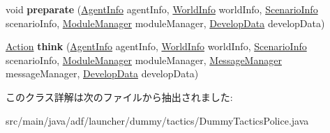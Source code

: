 \begin{DoxyCompactItemize}
\item 
\hypertarget{classadf_1_1launcher_1_1dummy_1_1tactics_1_1DummyTacticsPolice_ab4b404a1c2e61b3d0003aa7db622470f}{}\label{classadf_1_1launcher_1_1dummy_1_1tactics_1_1DummyTacticsPolice_ab4b404a1c2e61b3d0003aa7db622470f} 
void {\bfseries preparate} (\hyperlink{classadf_1_1agent_1_1info_1_1AgentInfo}{Agent\+Info} agent\+Info, \hyperlink{classadf_1_1agent_1_1info_1_1WorldInfo}{World\+Info} world\+Info, \hyperlink{classadf_1_1agent_1_1info_1_1ScenarioInfo}{Scenario\+Info} scenario\+Info, \hyperlink{classadf_1_1agent_1_1module_1_1ModuleManager}{Module\+Manager} module\+Manager, \hyperlink{classadf_1_1agent_1_1develop_1_1DevelopData}{Develop\+Data} develop\+Data)
\item 
\hypertarget{classadf_1_1launcher_1_1dummy_1_1tactics_1_1DummyTacticsPolice_a6adc498510571cecb9aeebf1b7f3931a}{}\label{classadf_1_1launcher_1_1dummy_1_1tactics_1_1DummyTacticsPolice_a6adc498510571cecb9aeebf1b7f3931a} 
\hyperlink{classadf_1_1agent_1_1action_1_1Action}{Action} {\bfseries think} (\hyperlink{classadf_1_1agent_1_1info_1_1AgentInfo}{Agent\+Info} agent\+Info, \hyperlink{classadf_1_1agent_1_1info_1_1WorldInfo}{World\+Info} world\+Info, \hyperlink{classadf_1_1agent_1_1info_1_1ScenarioInfo}{Scenario\+Info} scenario\+Info, \hyperlink{classadf_1_1agent_1_1module_1_1ModuleManager}{Module\+Manager} module\+Manager, \hyperlink{classadf_1_1agent_1_1communication_1_1MessageManager}{Message\+Manager} message\+Manager, \hyperlink{classadf_1_1agent_1_1develop_1_1DevelopData}{Develop\+Data} develop\+Data)
\end{DoxyCompactItemize}


このクラス詳解は次のファイルから抽出されました\+:\begin{DoxyCompactItemize}
\item 
src/main/java/adf/launcher/dummy/tactics/Dummy\+Tactics\+Police.\+java\end{DoxyCompactItemize}
